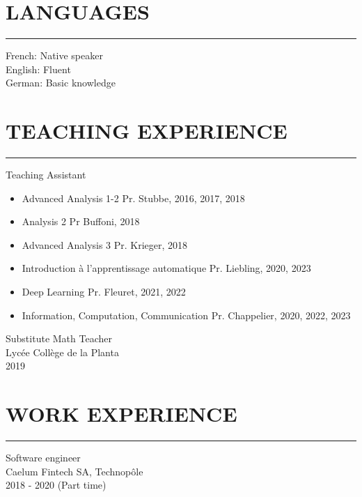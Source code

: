 \documentclass{article}
\let\oldhrule\hrule
\renewcommand{\hrule}{\color{lightgray}\oldhrule\color{black}}
\newcommand{\rubric}[1]{
    \color{mediumgray}

    \section*{\montserratlight \large \MakeUppercase{#1}} 
    \hrule
    \vspace{4mm}
    \raggedright
}
\begin{document}
\begin{minipage}[t]{0.3\textwidth}

  \rubric{Languages}
  \color{deepgray}
  French: Native speaker \\
  English: Fluent \\
  German: Basic knowledge

\end{minipage}\hfill
\begin{minipage}[t]{0.65\textwidth}

  \rubric{Teaching Experience}

  \color{deepgray}
  \large Teaching Assistant
  \color{mediumgray} \small
  \begin{itemize}
    \item \color{deepgray}Advanced Analysis 1-2  \color{mediumgray} Pr. Stubbe, 2016, 2017, 2018
    \item \color{deepgray}Analysis 2  \color{mediumgray} Pr Buffoni, 2018
    \item \color{deepgray}Advanced Analysis 3  \color{mediumgray} Pr. Krieger, 2018
    \item \color{deepgray}Introduction à l'apprentissage automatique  \color{mediumgray} Pr. Liebling, 2020, 2023
    \item \color{deepgray}Deep Learning  \color{mediumgray} Pr. Fleuret, 2021, 2022
    \item \color{deepgray}Information, Computation, Communication  \color{mediumgray} Pr. Chappelier, 2020, 2022, 2023
  \end{itemize}

  \vspace{4mm}
  \color{deepgray}
  \large Substitute Math Teacher \\
  \color{mediumgray} \small
  Lycée Collège de la Planta \\
  2019
  \rubric{Work Experience}

  \color{deepgray}
  \large Software engineer \\
  \color{mediumgray} \small
  Caelum Fintech SA, Technopôle \\
  2018 - 2020 (Part time)
  \vspace{4mm}
\end{minipage}
\end{document}
